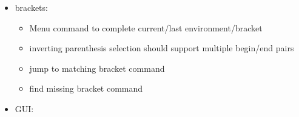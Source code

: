 \documentclass[10pt,a4paper,landscape]{report}
\begin{document}
\begin{itemize}
\begin{itemize}
	\item if completing a filename, and the selected file has the same extension as the current filename, remove the existing extension, show preview image
	\item auto close last environment/bracket
	\item complete command options after command (files for includegraphics, environsments for begin, citations, labels, packages, tikzpictures	)
	\item cut buffer for environment content (multiline to content, singleline to option ?)
	\item Word completion over all open documents
	\item Show definition of \verb+\newcommand+ commands in the completion list as hint
	\item \verb+\begin{Umgebungsname}+ should not add \verb+\end{Umgebungsname}+ if that \textbackslash end is already in the next/a later line
	 	\item Open completion list of xyz if cursor is after \verb+\xyz{+ (= ignore \verb+{}+ before cursor)
		\item treat \verb+\+abc\{\%<xyz\%>\} and \verb+\+abc\{\%<def\%>\} as identical and ignore one of them (in the list of possible completions)
		\item Understand \verb+newcounter, tex: \newcount \newfont \def, \edef, \xdef, \gdef+
		\item Detect completion within tikz/pstricks/... environments and show a list of corresponding tikz/... commands
		\item text completion should show parameters of commands (e.g. reference names) even if they aren't currently used
		\item merging text completion and spell checker cache?
	\end{itemize}
	\item brackets: \begin{itemize}
		\item Menu command to complete current/last environment/bracket
		\item inverting parenthesis selection should support multiple begin/end pairs
		\item jump to matching bracket command
		\item find missing bracket command
	\end{itemize}  
	\item GUI: \begin{itemize}

\end{itemize}
\end{itemize}
\end{document}
